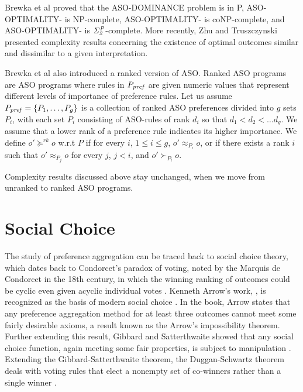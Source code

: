 Brewka et al \cite{Brewka03answerset} proved that
the ASO-DOMINANCE problem is in P, ASO-OPTIMALITY-
is NP-complete, ASO-OPTIMALITY- is coNP-complete,
and ASO-OPTIMALITY- is $\mathit{\Sigma^P_{2}}$-complete.
More recently, Zhu and Truszczynski \cite{ZhuT13}
presented complexity results concerning the existence of 
optimal outcomes similar and dissimilar
to a given interpretation.

Brewka et al \cite{Brewka03answerset} also introduced a
ranked version of ASO.
Ranked ASO programs are ASO programs where rules in $P_{\mathit{pref}}$
are given numeric values that represent different levels of importance
of preference rules.  
Let us assume $P_{\mathit{pref}}=\{P_1,\ldots,P_g\}$ is a collection of
ranked ASO preferences divided into $g$ sets $P_i$, with each set $P_i$
consisting
of ASO-rules of rank $d_i$ so that $d_1 < d_2<\ldots d_g$. We assume that
a lower rank of a preference
rule indicates its higher importance.
We define $o' \succeq^{rk} o$ w.r.t $P$ if for every $i$, $1\leq i\leq g$,
$o' \approx_{P_i} o$, or if there exists a rank $i$ such that
$o' \approx_{P_j} o$ for every $j$, $j< i$, and $o' \succ_{P_i} o$.

Complexity results discussed above stay unchanged, when we move from
unranked to ranked ASO programs.




\section{Social Choice}
The study of preference aggregation can be traced back to social choice theory,
which dates back to Condorcet's paradox of voting, noted by the
Marquis de Condorcet in the 18th century, in which
the winning ranking of outcomes could be cyclic even 
given acyclic individual votes \cite{wiki:soc}.
Kenneth Arrow's work, ,
is recognized as the basis of modern social choice \cite{aarrow:b:socialchoice}.
In the book, Arrow states that any preference aggregation method for at least three
outcomes cannot meet some fairly desirable axioms, a result known as
the Arrow's impossibility theorem.
Further extending this result, Gibbard and Satterthwaite showed
that any social choice function, again meeting some fair properties, is subject
to manipulation \cite{gib:j:maip-scheme,satt:j:strat-proof}.
Extending the Gibbard-Satterthwaite theorem, the Duggan-Schwartz theorem deals with 
voting rules that elect a nonempty set of co-winners rather than a single winner
\cite{dug-sch:j:maipres}.

